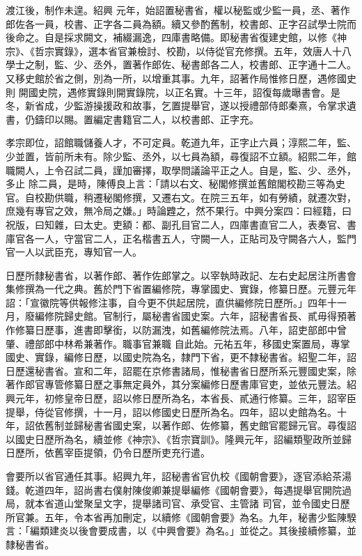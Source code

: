 \begin{pinyinscope}
 渡江後，制作未遑。紹興
 元年，始詔置秘書省，權以秘監或少監一員，丞、著作郎佐各一員，校書、正字各二員為額。續又參酌舊制，校書郎、正字召試學士院而後命之。自是採求闕文，補綴漏逸，四庫書略備。即秘書省復建史館，以修《神宗》、《哲宗實錄》，選本省官兼檢討、校勘，以侍從官充修撰。五年，效唐人十八學士之制，監、少、丞外，置著作郎佐、秘書郎各二人，校書郎、正字通十二人。又移史館於省之側，別為一所，以增重其事。九年，詔著作局惟修日歷，遇修國史則
 開國史院，遇修實錄則開實錄院，以正名實。十三年，詔復每歲曝書會。是冬，新省成，少監游操援政和故事，乞置提舉官，遂以授禮部侍郎秦熹，令掌求遺書，仍鑄印以賜。置編定書籍官二人，以校書郎、正字充。



 孝宗即位，詔館職儲養人才，不可定員。乾道九年，正字止六員；淳熙二年，監、少並置，皆前所未有。除少監、丞外，以七員為額，尋復詔不立額。紹熙二年，館職闕人，上令召試二員，謹加審擇，取學問議論平正之人。自是，監、少、丞外，多止
 除二員，是時，陳傅良上言：「請以右文、秘閣修撰並舊館閣校勘三等為史官。自校勘供職，稍遷秘閣修撰，又遷右文。在院三五年，如有勞績，就遷次對，庶幾有專官之效，無冷局之嫌。」時論韙之，然不果行。中興分案四：曰經籍，曰祝版，曰知雜，曰太史。吏額：都、副孔目官二人，四庫書直官二人，表奏官、書庫官各一人，守當官二人，正名楷書五人，守闕一人，正貼司及守闕各六人，監門官一人以武臣充，專知官一人。



 日歷所隸秘書省，以著作郎、著作佐郎掌之。以宰執時政記、左右史起居注所書會集修撰為一代之典。舊於門下省置編修院，專掌國史、實錄，修纂日歷。元豐元年詔：「宣徽院等供報修注事，自今更不供起居院，直供編修院日歷所。」四年十一月，廢編修院歸史館。官制行，屬秘書省國史案。六年，詔秘書省長、貳毋得預著作修纂日歷事，進書即擊銜，以防漏洩，如舊編修院法焉。八年，詔吏部郎中曾肇、禮部郎中林希兼著作。職事官兼職
 自此始。元祐五年，移國史案置局，專掌國史、實錄，編修日歷，以國史院為名，隸門下省，更不隸秘書省。紹聖二年，詔日歷還秘書省。宣和二年，詔罷在京修書諸局，惟秘書省日歷所系元豐國史案，除著作郎官專管修纂日歷之事無定員外，其分案編修日歷書庫官吏，並依元豐法。紹興元年，初修皇帝日歷，詔以修日歷所為名，本省長、貳通行修纂。三年，詔宰臣提舉，侍從官修撰，十一月，詔以修國史日歷所為名。四年，詔以史館為名。十
 年，詔依舊制並歸秘書省國史案，以著作郎、佐修纂，舊史館官罷歸元官。尋復詔以國史日歷所為名，續並修《神宗》、《哲宗寶訓》。隆興元年，詔編類聖政所並歸日歷所，依舊宰臣提領，仍令日歷所吏充行遣。



 會要所以省官通任其事。紹興九年，詔秘書省官仇校《國朝會要》，逐官添給茶湯錢。乾道四年，詔尚書右僕射陳俊卿兼提舉編修《國朝會要》，每遇提舉官開院過局，就本省道山堂聚呈文字，提舉諸司官、承受官、主管諸
 司官，並令國史日歷所官兼。五年，令本省再加刪定，以續修《國朝會要》為名。九年，秘書少監陳騤言：「編類建炎以後會要成書，以《中興會要》為名。」並從之。其後接續修纂，並隸秘書省。




\end{pinyinscope}
